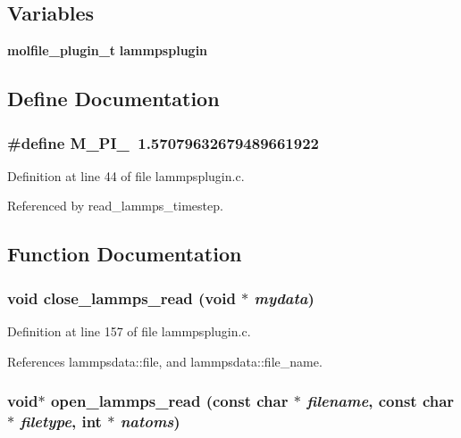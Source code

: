 \subsection*{Variables}
\begin{CompactItemize}
\item 
{\bf molfile\_\-plugin\_\-t} {\bf lammpsplugin}
\end{CompactItemize}


\subsection{Define Documentation}
\subsubsection{\setlength{\rightskip}{0pt plus 5cm}\#define M\_\-PI\_\ 1.57079632679489661922}\label{lammpsplugin_8c_a0}




Definition at line 44 of file lammpsplugin.c.

Referenced by read\_\-lammps\_\-timestep.

\subsection{Function Documentation}
\subsubsection{\setlength{\rightskip}{0pt plus 5cm}void close\_\-lammps\_\-read (void $\ast$ {\em mydata})\hspace{0.3cm}{\tt  [static]}}\label{lammpsplugin_8c_a4}




Definition at line 157 of file lammpsplugin.c.

References lammpsdata::file, and lammpsdata::file\_\-name.
\subsubsection{\setlength{\rightskip}{0pt plus 5cm}void$\ast$ open\_\-lammps\_\-read (const char $\ast$ {\em filename}, const char $\ast$ {\em filetype}, int $\ast$ {\em natoms})\hspace{0.3cm}{\tt  [static]}}\label{lammpsplugin_8c_a2}




